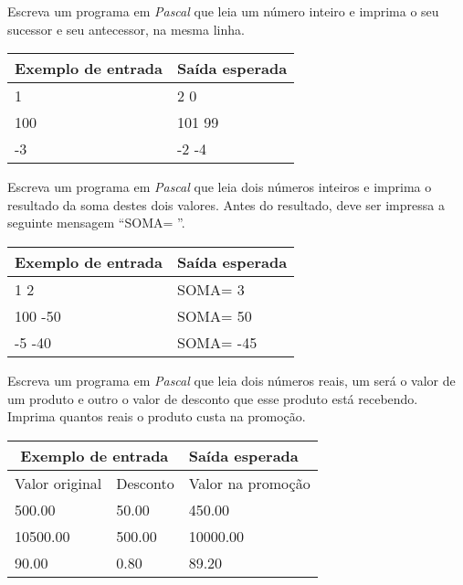 
\item Escreva um programa em \emph{Pascal} que leia um número inteiro e 
imprima o seu sucessor e seu antecessor, na mesma linha.

\begin{center}
\begin{tabular}{|l|l|} \hline
Exemplo de entrada & Saída esperada \\ \hline
1               & 2 0 \\ \hline
100             & 101 99 \\ \hline
-3              & -2 -4 \\ \hline
\end{tabular}
\end{center}

\item Escreva um programa em \emph{Pascal} que leia dois números inteiros e 
imprima o resultado da soma destes dois valores. Antes do resultado, deve ser 
impressa a seguinte mensagem ``SOMA= ''.


\begin{center}
\begin{tabular}{|l|l|} \hline
Exemplo de entrada & Saída esperada \\ \hline
1 2             & SOMA= 3 \\ \hline
100 -50         & SOMA= 50 \\ \hline
-5 -40          & SOMA= -45 \\ \hline
\end{tabular}
\end{center}

\item Escreva um programa em \emph{Pascal} que leia dois números reais, um 
será o valor de um produto e outro o valor de desconto que esse produto está 
recebendo. Imprima quantos reais o produto custa na promoção.

\begin{center}
\begin{tabular}{|l|l|l|} \hline
\multicolumn{2}{|c|}{Exemplo de entrada} & Saída esperada \\ \hline
Valor original & Desconto & Valor na promoção \\ \hline
500.00         & 50.00  & 450.00 \\ \hline
10500.00       & 500.00 & 10000.00\\ \hline
90.00          & 0.80   & 89.20 \\ \hline
\end{tabular}
\end{center}

